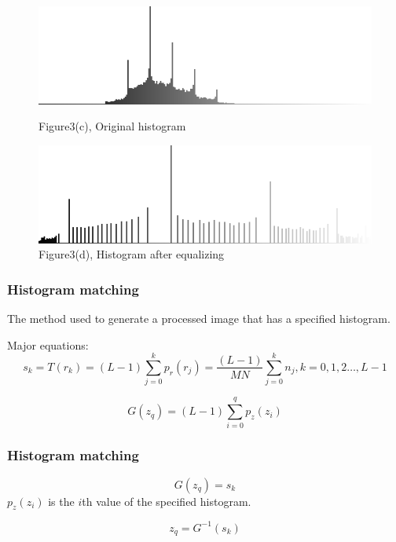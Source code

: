 \documentclass[notheorems, serif, table, compress]{beamer}  %
\begin{document}
\begin{frame}
\begin{figure}
        \begin{minipage}[t]{0.4\linewidth}
        \centering
        \includegraphics[width=0.6\linewidth]{huafenzhifang.png} 
        \caption{Figure3(c), Original histogram}
        \end{minipage}
        \begin{minipage}[t]{0.4\linewidth}
        \centering
        \includegraphics[width=0.6\linewidth]{huafeneqzhifang.png} 
          \caption{Figure3(d), Histogram after equalizing}
        \end{minipage}
    \end{figure}
\end{frame}




\begin{frame}
\frametitle{Histogram matching} %
    
The method used to generate a processed image that has a specified histogram.


Major equations:
 \begin{equation} \label {3.13}
s_{k}=T(r_{k})=(L-1)\sum_{j=0}^{k}p_{r}(r_{j})=\frac{(L-1)}{MN}\sum_{j=0}^{k}{n_{j}}, k=0, 1, 2\ldots, L-1
\end{equation}
 
  \begin{equation} \label {3.14}
G(z_{q})=(L-1)\sum_{i=0}^{q}p_{z}(z_{i})
\end{equation}
\end{frame}

\begin{frame}
\frametitle{Histogram matching}
\begin{equation} \label {3.15}
G(z_{q})=s_{k}
\end{equation}
$p_z(z_{i})$ is the $i$th value of the specified histogram.

\begin{equation} \label {3.16}
z_{q}=G^{-1}(s_{k})
\end{equation}
\end{frame}
\end{document}
